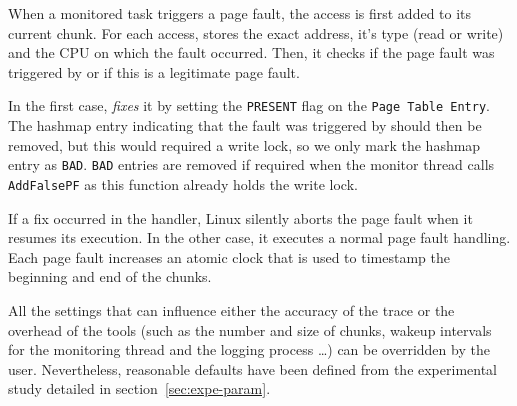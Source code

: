When a monitored task triggers a page fault, the access is first added
to its current chunk. For each access, \Moca stores the exact address, it's type (read
or write) and the CPU on which the fault occurred.  Then, it checks if the page
fault was triggered by \Moca or if this is a legitimate page fault.

In the first
case, \Moca \emph{fixes} it by setting the \texttt{PRESENT} flag on the
\texttt{Page Table Entry}.
The hashmap entry indicating that the fault was triggered by \Moca should then
be removed, but this would required a write lock, so we only mark the hashmap
entry as \texttt{BAD}. \texttt{BAD} entries are removed if required when the
monitor thread calls \texttt{AddFalsePF} as this function already holds the
write lock.

If a fix occurred in the \Moca handler, Linux silently aborts the page fault
when it resumes its execution. In the other case, it executes a normal page fault handling. Each page
fault increases an atomic clock that is used to timestamp the beginning and end
of the chunks.

All the settings that can influence either the accuracy of the trace or the
overhead of the tools (such as the number and size of chunks, wakeup intervals
for the monitoring thread and the logging process \ldots) can be overridden by the
user. Nevertheless, reasonable defaults have been defined from the experimental study
detailed in section~\ref{sec:expe-param}.
